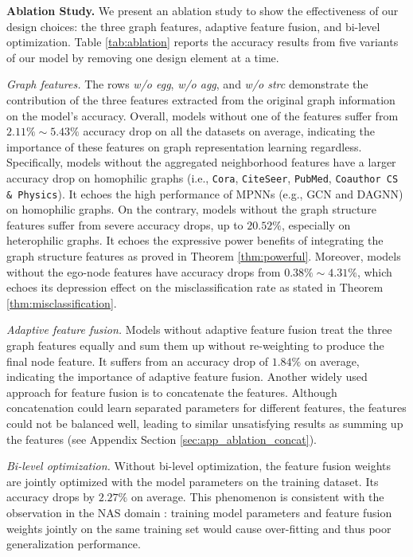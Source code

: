 \documentclass{article}
\theoremstyle{plain}
\newcommand{\mypar}[1]{{\vspace{0.05cm} \noindent \bf #1}}
\begin{document}
\mypar{Ablation Study.} 
We present an ablation study to show the effectiveness of our design choices: the three graph features, adaptive feature fusion, and bi-level optimization. 
Table \ref{tab:ablation} reports the accuracy results from five variants of our model by removing one design element at a time. 


\textit{Graph features.} The rows \textit{w/o egg}, \textit{w/o agg}, and \textit{w/o strc} demonstrate the contribution of the three features extracted from the original graph information on the model's accuracy.
Overall, models without one of the features suffer from $2.11\% \sim 5.43\%$ accuracy drop on all the datasets on average, indicating the importance of these features on graph representation learning regardless.
Specifically, models without the aggregated neighborhood features have a larger accuracy drop on homophilic graphs (i.e., \texttt{Cora}, \texttt{CiteSeer}, \texttt{PubMed}, \texttt{Coauthor CS \& Physics}). It echoes the high performance of MPNNs (e.g., GCN and DAGNN) on homophilic graphs. 
On the contrary, models without the graph structure features suffer from severe accuracy drops, up to $20.52\%$, especially on heterophilic graphs. It echoes the expressive power benefits of integrating the graph structure features as proved in Theorem \ref{thm:powerful}.   
Moreover, models without the ego-node features have accuracy drops from $0.38\% \sim 4.31\%$, which echoes its depression effect on the misclassification rate as stated in Theorem \ref{thm:misclassification}.

\textit{Adaptive feature fusion.} Models without adaptive feature fusion treat the three graph features equally and sum them up without re-weighting to produce the final node feature. It suffers from an accuracy drop of $1.84\%$ on average, indicating the importance of adaptive feature fusion. Another widely used approach for feature fusion is to concatenate the features. Although concatenation could learn separated parameters for different features, the features could not be balanced well, leading to similar unsatisfying results as summing up the features (see Appendix Section \ref{sec:app_ablation_concat}). 

\textit{Bi-level optimization.} 
Without bi-level optimization, the feature fusion weights are jointly optimized with the model parameters on the training dataset. Its accuracy drops by $2.27\%$ on average. 
This phenomenon is consistent with the observation in the NAS domain \cite{liu2018darts}: training model parameters and feature fusion weights jointly on the same training set would cause over-fitting and thus poor generalization performance.
\end{document}

